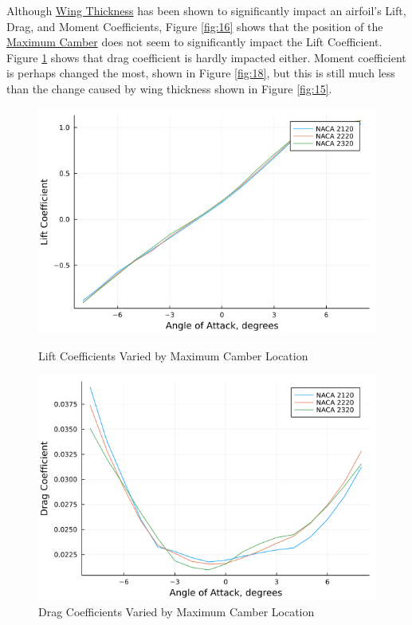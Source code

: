 \documentclass{article}
\begin{document}
Although \hyperlink{Th}{Wing Thickness} has been shown to significantly impact an airfoil's Lift, Drag, and Moment Coefficients, Figure \ref{fig:16} shows that the position of the \hyperlink{Camber}{Maximum Camber} does not seem to significantly impact the Lift Coefficient. Figure \ref{fig:17} shows that drag coefficient is hardly impacted either. Moment coefficient is perhaps changed the most, shown in Figure \ref{fig:18}, but this is still much less than the change caused by wing thickness shown in Figure \ref{fig:15}.

\begin{figure}[!htb]
  \includegraphics[width=\linewidth]{Figure16.png}
  \caption{Lift Coefficients Varied by Maximum Camber Location}\label{fig:16}
\endminipage\hfill
{}
  \includegraphics[width=\linewidth]{Figure17.png}
  \caption{Drag Coefficients Varied by Maximum Camber Location}\label{fig:17}

\end{figure}
\end{document}
